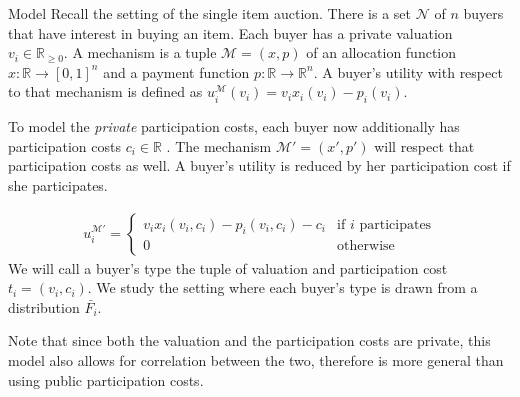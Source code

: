 \documentclass[11pt,a4paper]{article}
\newcommand{\RR}{\ensuremath{\mathbb{R}}}
\newcommand{\1}[1]{\mbox{\rm\bf 1}_{#1}}
\begin{document}
\begin{section}{Model}
 \label{sec:model}
 Recall the setting of the single item auction.
 There is a set $\mathcal{N}$ of $n$ buyers that have interest in buying an item.
 Each buyer has a private valuation $v_i \in \RR_{\geq 0}$.
 A mechanism is a tuple $\mathcal{M} = (x,p)$ of an allocation function $x: \RR \rightarrow [0,1]^n$ and a payment function $p: \RR \rightarrow \RR^n$.
 A buyer's utility with respect to that mechanism is defined as $u_i^\mathcal{M}(v_i) = v_i x_i(v_i) - p_i(v_i)$.

 To model the \textit{private} participation costs, each buyer now additionally has participation costs $c_i \in \RR$ \cite{primary}.
 The mechanism $\mathcal{M}' = (x', p')$ will respect that participation costs as well.
 A buyer's utility is reduced by her participation cost if she participates.

 \begin{align*}
     u_i^{\mathcal{M}'} = \begin{cases}
                              v_i x_i(v_i, c_i) - p_i(v_i, c_i) - c_i & \text{if $i$ participates} \\
                              0                                       & \text{otherwise}
                          \end{cases}
 \end{align*}
 We will call a buyer's type the tuple of valuation and participation cost $t_i = (v_i, c_i)$.
 We study the setting where each buyer's type is drawn from a distribution $\bar{F_i}$.

 Note that since both the valuation and the participation costs are private, this model also allows for correlation between the two, therefore is more general than using public participation costs.  
\end{section}
\end{document}
